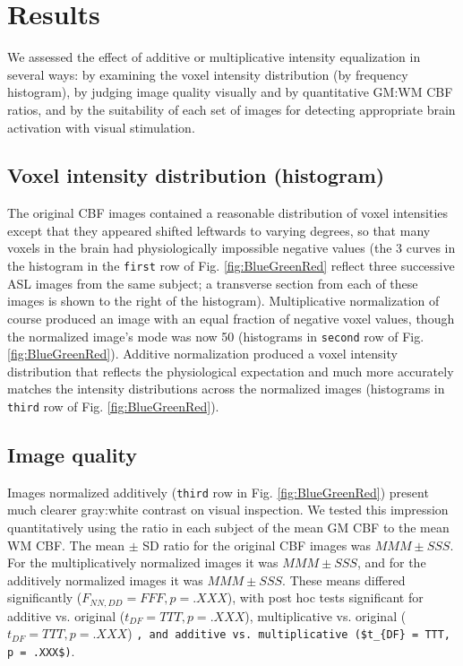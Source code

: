 \section{Results}
We assessed the effect of additive or multiplicative intensity equalization in several ways: by examining the voxel intensity distribution (by frequency histogram), by judging image quality visually and by quantitative GM:WM CBF ratios, and by the suitability of each set of images for detecting appropriate brain activation with visual stimulation.

\subsection{Voxel intensity distribution (histogram)}
The original CBF images contained a reasonable distribution of voxel intensities except that they appeared shifted leftwards to varying degrees, so that many voxels in the brain had physiologically impossible negative values (the 3 curves in the histogram in the \verb|first| row of Fig. \ref{fig:BlueGreenRed} reflect three successive ASL images from the same subject; a transverse section from each of these images is shown to the right of the histogram). Multiplicative normalization of course produced an image with an equal fraction of negative voxel values, though the normalized image's mode was now 50 (histograms in \verb|second| row of Fig. \ref{fig:BlueGreenRed}). Additive normalization produced a voxel intensity distribution that reflects the physiological expectation and much more accurately matches the intensity distributions across the normalized images (histograms in \verb|third| row of Fig. \ref{fig:BlueGreenRed}). 

\subsection{Image quality}
Images normalized additively (\verb|third| row in Fig. \ref{fig:BlueGreenRed}) present much clearer gray:white contrast on visual inspection. We tested this impression quantitatively using the ratio in each subject of the mean GM CBF to the mean WM CBF. The mean $\pm$ SD ratio for the original CBF images was $MMM \pm SSS$. For the multiplicatively normalized images it was $MMM \pm SSS$, and for the additively normalized images it was $MMM \pm SSS$. These means differed significantly ($F_{NN,DD} = FFF, p = .XXX$), with post hoc tests significant for additive vs. original ($t_{DF} = TTT, p = .XXX$), multiplicative vs. original ($t_{DF} = TTT, p = .XXX$) \verb|, and additive vs. multiplicative ($t_{DF} = TTT, p = .XXX$)|.

